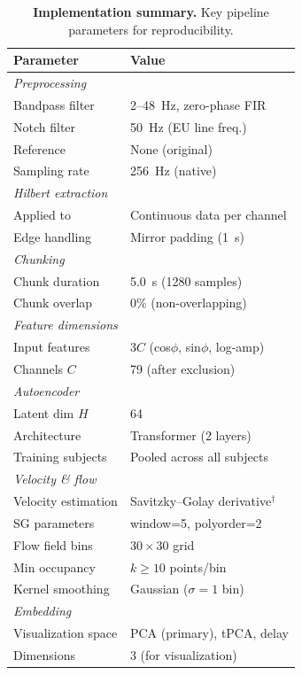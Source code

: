 \documentclass[5p,twocolumn,authoryear]{elsarticle}
\begin{document}
\begin{table}[h]
\centering
\caption{\textbf{Implementation summary.} Key pipeline parameters for reproducibility.}
\label{tab:implementation_summary}
\begin{tabular}{ll}
\toprule
\textbf{Parameter} & \textbf{Value} \\
\midrule
\multicolumn{2}{l}{\emph{Preprocessing}} \\
Bandpass filter & 2--48~Hz, zero-phase FIR \\
Notch filter & 50~Hz (EU line freq.) \\
Reference & None (original) \\
Sampling rate & 256~Hz (native) \\
\midrule
\multicolumn{2}{l}{\emph{Hilbert extraction}} \\
Applied to & Continuous data per channel \\
Edge handling & Mirror padding (1~s) \\
\midrule
\multicolumn{2}{l}{\emph{Chunking}} \\
Chunk duration & 5.0~s (1280 samples) \\
Chunk overlap & 0\% (non-overlapping) \\
\midrule
\multicolumn{2}{l}{\emph{Feature dimensions}} \\
Input features & $3C$ (cos$\phi$, sin$\phi$, log-amp) \\
Channels $C$ & 79 (after exclusion) \\
\midrule
\multicolumn{2}{l}{\emph{Autoencoder}} \\
Latent dim $H$ & 64 \\
Architecture & Transformer (2 layers) \\
Training subjects & Pooled across all subjects \\
\midrule
\multicolumn{2}{l}{\emph{Velocity \& flow}} \\
Velocity estimation & Savitzky--Golay derivative$^\dagger$ \\
SG parameters & window=5, polyorder=2 \\
Flow field bins & $30 \times 30$ grid \\
Min occupancy & $k \geq 10$ points/bin \\
Kernel smoothing & Gaussian ($\sigma=1$ bin) \\
\midrule
\multicolumn{2}{l}{\emph{Embedding}} \\
Visualization space & PCA (primary), tPCA, delay \\
Dimensions & 3 (for visualization) \\

\end{tabular}
\end{table}
\end{document}
